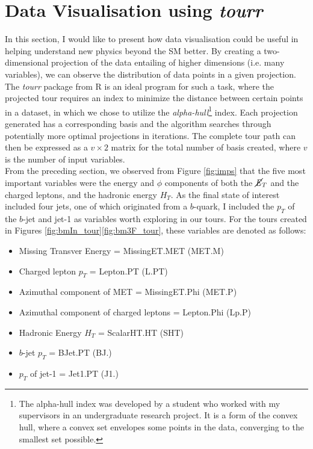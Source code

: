 \section{Data Visualisation using \textit{tourr}}
In this section, I would like to present how data visualisation could be useful in helping understand new physics beyond the SM better. By creating a two-dimensional projection of the data entailing of higher dimensions (i.e. many variables), we can observe the distribution of data points in a given projection. The \textit{tourr} package from R \cite{tourr} is an ideal program for such a task, where the projected tour requires an index to minimize the distance between certain points in a dataset, in which we chose to utilize the \textit{alpha-hull}\footnote{The alpha-hull index was developed by a student who worked with my supervisors in an undergraduate research project. It is a form of the convex hull, where a convex set envelopes some points in the data, converging to the smallest set possible.} index. Each projection generated has a corresponding basis and the algorithm searches through potentially more optimal projections in iterations. The complete tour path can then be expressed as a $v\times2$ matrix for the total number of basis created, where $v$ is the number of input variables. \\

From the preceding section, we observed from Figure \ref{fig:imps} that the five most important variables were the energy and $\phi$ components of both the $\cancel{\it{E}}_{T}$ and the charged leptons, and the hadronic energy $H_T$. As the final state of interest included four jets, one of which originated from a $b$-quark, I included the $p_T$ of the $b$-jet and jet-1 as variables worth exploring in our tours. For the tours created in Figures \ref{fig:bmIn_tour}\textemdash\ref{fig:bm3F_tour}, these variables are denoted as follows:

\begin{itemize}
    \item Missing Transver Energy = MissingET.MET (MET.M)
    \item Charged lepton $p_T$ = Lepton.PT (L.PT)
    \item Azimuthal component of MET = MissingET.Phi (MET.P)
    \item Azimuthal component of charged leptons = Lepton.Phi (Lp.P)
    \item Hadronic Energy $H_T$ = ScalarHT.HT (SHT)
    \item $b$-jet $p_T$ = BJet.PT (BJ.)
    \item $p_T$ of jet-1 = Jet1.PT (J1.)
\end{itemize}

